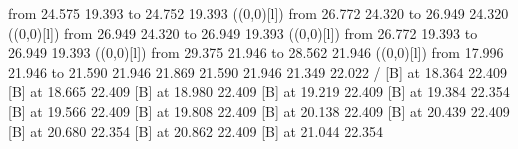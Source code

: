 {{\color[rgb]{0,0,0}\putrule from 24.575 19.393 to 24.752 19.393
}%
%
%
\linethickness=1pt
\setplotsymbol ({\makebox(0,0)[l]{\tencirc{}}})
{\color[rgb]{0,0,0}\putrule from 26.772 24.320 to 26.949 24.320
}%
%
%
\linethickness=1pt
\setplotsymbol ({\makebox(0,0)[l]{\tencirc{}}})
{\color[rgb]{0,0,0}\putrule from 26.949 24.320 to 26.949 19.393
}%
%
%
\linethickness=1pt
\setplotsymbol ({\makebox(0,0)[l]{\tencirc{}}})
{\color[rgb]{0,0,0}\putrule from 26.772 19.393 to 26.949 19.393
}%
%
%
\linethickness=1pt
\setplotsymbol ({\makebox(0,0)[l]{\tencirc{}}})
{\color[rgb]{0,0,0}\putrule from 29.375 21.946 to 28.562 21.946
}%
%
%
\linethickness=1pt
\setplotsymbol ({\makebox(0,0)[l]{\tencirc{}}})
{\color[rgb]{0,0,0}\putrule from 17.996 21.946 to 21.590 21.946
%
%
 21.869 21.590 21.946 21.349 22.022 /
%
}%
%
%
 [B] at 18.364 22.409
%
%
 [B] at 18.665 22.409
%
%
 [B] at 18.980 22.409
%
%
 [B] at 19.219 22.409
%
%
 [B] at 19.384 22.354
%
%
 [B] at 19.566 22.409
%
%
 [B] at 19.808 22.409
%
%
 [B] at 20.138 22.409
%
%
 [B] at 20.439 22.409
%
%
 [B] at 20.680 22.354
%
%
 [B] at 20.862 22.409
%
%
 [B] at 21.044 22.354
%
}
